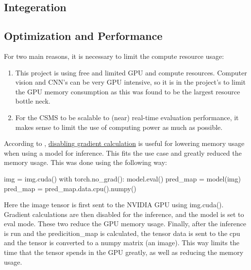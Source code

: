 \documentclass[
]{article}
\newenvironment{Shaded}{\begin{snugshade}}{\end{snugshade}}
\newcommand{\BuiltInTok}[1]{\textcolor[rgb]{0.00,0.23,0.31}{#1}}
\newcommand{\ControlFlowTok}[1]{\textcolor[rgb]{0.00,0.23,0.31}{#1}}
\newcommand{\NormalTok}[1]{\textcolor[rgb]{0.00,0.23,0.31}{#1}}
\newcommand{\OperatorTok}[1]{\textcolor[rgb]{0.37,0.37,0.37}{#1}}
\begin{document}
\hypertarget{integeration}{%
\subsection{Integeration}\label{integeration}}

\hypertarget{optimization-and-performance}{%
\subsection{Optimization and
Performance}\label{optimization-and-performance}}

For two main reasons, it is necessary to limit the compute resource
usage:

\begin{enumerate}
\def\labelenumi{\arabic{enumi}.}
\item
  This project is using free and limited GPU and compute resources.
  Computer vision and CNN's can be very GPU intensive, so it is in the
  project's to limit the GPU memory consumption as this was found to be
  the largest resource bottle neck.
\item
  For the CSMS to be scalable to (near) real-time evaluation
  performance, it makes sense to limit the use of computing power as
  much as possible.
\end{enumerate}

According to \textcite{pytorch},
\href{https://pytorch.org/docs/stable/generated/torch.no_grad.html}{disabling
gradient calculation} is useful for lowering memory usage when using a
model for inference. This fits the use case and greatly reduced the
memory usage. This was done using the following way:

\begin{Shaded}
\begin{Highlighting}[]
\NormalTok{img }\OperatorTok{=}\NormalTok{ img.cuda()}
\ControlFlowTok{with}\NormalTok{ torch.no\_grad():}
\NormalTok{  model.}\BuiltInTok{eval}\NormalTok{()}
\NormalTok{  pred\_map }\OperatorTok{=}\NormalTok{ model(img)}
\NormalTok{pred\_map }\OperatorTok{=}\NormalTok{ pred\_map.data.cpu().numpy()}
\end{Highlighting}
\end{Shaded}

Here the image tensor is first sent to the NVIDIA GPU using img.cuda().
Gradient calculations are then disabled for the inference, and the model
is set to eval mode. These two reduce the GPU memory usage. Finally,
after the inference is run and the predicition\_map is calculated, the
tensor data is sent to the cpu and the tensor is converted to a numpy
matrix (an image). This way limits the time that the tensor spends in
the GPU greatly, as well as reducing the memory usage.
\end{document}
